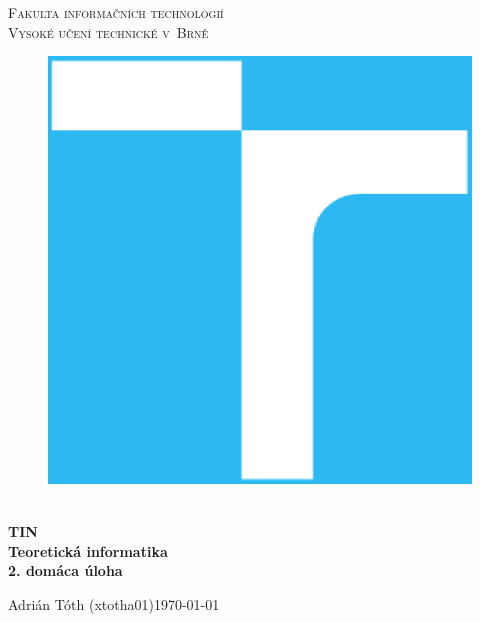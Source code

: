 \documentclass[11pt,a4paper]{article}
\begin{document}
\begin{titlepage}
    \begin{center}
        \Huge
        \textsc{
            Fakulta informačních technologií\\
            Vysoké učení technické v~Brně
        }
        \vspace{80px}
        \begin{figure}[!h]
            \centering
            \includegraphics[scale=0.3]{img/vutbr-fit-logo.eps}
        \end{figure}
        \\[15mm]
        \Huge{
            \textbf{
                TIN
            }
        }
        \\[1.5mm]
        \huge{
            \textbf{
                Teoretická informatika
            }
        }
        \\[2.5em]
        \LARGE{
            \textbf{
                2. domáca úloha
            }
        }
        \vfill
    \end{center}
        \Large{
            Adrián Tóth (xtotha01)\hfill \today
        }
\end{titlepage}

\setlength{\parskip}{0pt}
\hypersetup{hidelinks}\tableofcontents
\setlength{\parskip}{0pt}
\end{document}
